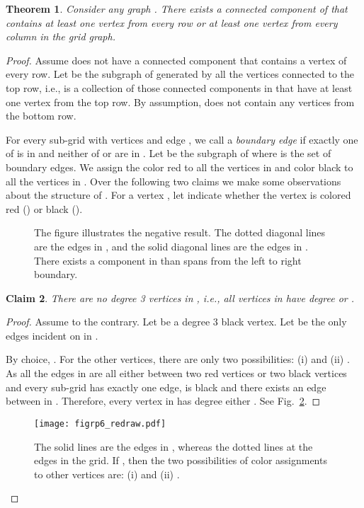 \documentclass[11pt]{article}
\newtheorem{theorem}{Theorem}[section]
\newtheorem{claim}[theorem]{Claim}
\newcommand{\FI}[1]{Fig.\ \ref{#1}}
\begin{document}
\begin{theorem}\label{dis}
Consider any graph .  There exists a connected component of  that contains at least one vertex from every row or at least one vertex from every column in the grid graph.
\end{theorem}
\begin{proof}
Assume  does not have a connected component that contains a vertex of every row. Let  be the subgraph of  generated by all the vertices connected to the top row, i.e.,  is a collection of those connected components in  that have at least one vertex from the top row. By assumption,  does not contain any vertices from the bottom row. 

For every  sub-grid with vertices  and edge , we call  a {\em boundary edge} if exactly one of  is in  and neither of  or  are in . Let  be the subgraph of  where  is the set of boundary edges. We assign the color red to all the vertices in  and color black to all the vertices in . Over the following two claims we make some observations about the structure of . For a vertex , let  indicate whether the vertex is colored red () or black ().

\begin{figure}[t]
\begin{center}  
\end{center}
\caption{The figure illustrates the negative result. The dotted diagonal lines are the edges in , and the solid diagonal lines are the edges in . There exists a component in  than spans from the left to right boundary. } 
\label{all}
\end{figure}

\begin{claim}
There are no degree 3 vertices in , i.e., all vertices in  have degree  or .
\end{claim}
\begin{proof}
Assume to the contrary. Let  be a degree 3 black vertex. Let  be the only edges incident on  in . 


By choice, . For the other vertices, there are only two possibilities: (i)  and (ii) .  As all the edges in  are all either between two red vertices or two black vertices and every  sub-grid has exactly one edge,  is black and there exists an edge between  in .  Therefore, every vertex in  has degree either . See \FI{fig:cla1}.
\end{proof}
\begin{figure}[h]
\begin{center}
\texttt{[image: figrp6\_redraw.pdf]}
\caption{The solid lines are the edges in , whereas the dotted lines at the edges in the grid. If , then the two possibilities of color assignments to other vertices are: (i)  and (ii) .}
\label{fig:cla1}
\end{center}
\end{figure}



\end{proof}
\end{document}
